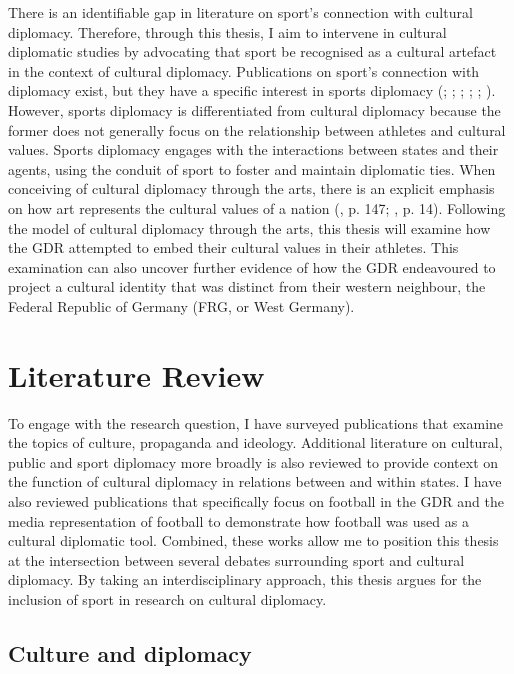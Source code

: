 There is an identifiable gap in literature on sport’s connection with cultural diplomacy. Therefore, through this thesis, I aim to intervene in cultural diplomatic studies by advocating that sport be recognised as a cultural artefact in the context of cultural diplomacy. Publications on sport’s connection with diplomacy exist, but they have a specific interest in sports diplomacy (\cite{holt1999}; \cite{tomlinson2016}; \cite{cooley2018}; \cite{murray2018}; \cite{rowe2018}; \cite{shuman2018}). However, sports diplomacy is differentiated from cultural diplomacy because the former does not generally focus on the relationship between athletes and cultural values. Sports diplomacy engages with the interactions between states and their agents, using the conduit of sport to foster and maintain diplomatic ties. When conceiving of cultural diplomacy through the arts, there is an explicit emphasis on how art represents the cultural values of a nation (\cite{gonçalves2016}, p. 147; \cite{johnson2016}, p. 14). Following the model of cultural diplomacy through the arts, this thesis will examine how the GDR attempted to embed their cultural values in their athletes. This examination can also uncover further evidence of how the GDR endeavoured to project a cultural identity that was distinct from their western neighbour, the Federal Republic of Germany (FRG, or West Germany).

\section*{Literature Review}

To engage with the research question, I have surveyed publications that examine the topics of culture, propaganda and ideology. Additional literature on cultural, public and sport diplomacy more broadly is also reviewed to provide context on the function of cultural diplomacy in relations between and within states. I have also reviewed publications that specifically focus on football in the GDR and the media representation of football to demonstrate how football was used as a cultural diplomatic tool. Combined, these works allow me to position this thesis at the intersection between several debates surrounding sport and cultural diplomacy. By taking an interdisciplinary approach, this thesis argues for the inclusion of sport in research on cultural diplomacy.

\subsection*{Culture and diplomacy}

